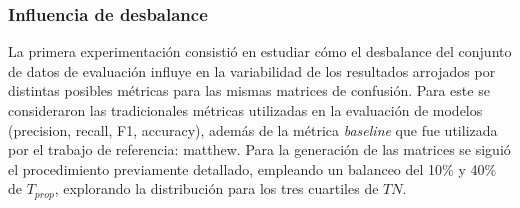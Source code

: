 \subsubsection{Influencia de desbalance}
La primera experimentación consistió en estudiar cómo el desbalance del conjunto de datos de evaluación influye en la variabilidad de los resultados arrojados por distintas posibles métricas para las mismas matrices de confusión. 
Para este se consideraron las tradicionales métricas utilizadas en la evaluación de modelos (precision, recall, F1, accuracy), además de la métrica \textit{baseline} que fue utilizada por el trabajo de referencia: matthew. Para la generación de las matrices se siguió el procedimiento previamente detallado, empleando un balanceo del 10\% y 40\% de $T_{prop}$, explorando la distribución para los tres cuartiles de $TN$.



